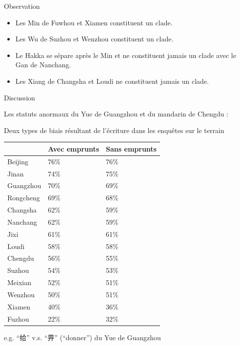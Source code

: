\documentclass[11pt]{beamer}
\begin{document}
\begin{frame}{Observation}
\begin{itemize}
\item{Les Min de Fuwhou et Xiamen constituent un clade.}

\item{Les Wu de Suzhou et Wenzhou constituent un clade.}

\item{Le Hakka se sépare après le Min et ne constituent jamais un clade avec le Gan de Nanchang.}

\item{Les Xiang de Changsha et Loudi ne constituent jamais un clade.}
\end{itemize}
\end{frame}

\begin{frame}{Discussion}
\begin{tiny}
Les statuts anormaux du Yue de Guangzhou et du mandarin de Chengdu : 

Deux types de biais résultant de l'écriture dans les enquêtes sur le terrain

    \begin{tabular}{lll}
    \toprule
          & \multicolumn{1}{l}{Avec emprunts} & \multicolumn{1}{l}{Sans emprunts} \\
    \midrule
    Beijing    & 76\%  & 76\% \\
    Jinan      & 74\%  & 75\% \\
    Guangzhou  & \cellcolor[rgb]{ .851,  .851,  .851}70\% & \cellcolor[rgb]{ .851,  .851,  .851}69\% \\
    Rongcheng  & 69\%  & 68\% \\
    \midrule
    Changsha   & 62\%  & 59\% \\
    Nanchang   & 62\%  & 59\% \\
    Jixi       & 61\%  & 61\% \\
    Loudi      & 58\%  & 58\% \\
    Chengdu    & \cellcolor[rgb]{ .851,  .851,  .851}56\% & \cellcolor[rgb]{ .851,  .851,  .851}55\% \\
    Suzhou     & 54\%  & 53\% \\
    \midrule
    Meixian    & 52\%  & 51\% \\
    Wenzhou    & 50\%  & 51\% \\
    Xiamen     & 40\%  & 36\% \\
    Fuzhou     & 22\%  & 32\% \\
    \bottomrule
    \end{tabular}%

e.g. ``给'' v.s. ``畀'' (``donner'') du Yue de Guangzhou
\end{tiny}
\end{frame}
\end{document}
